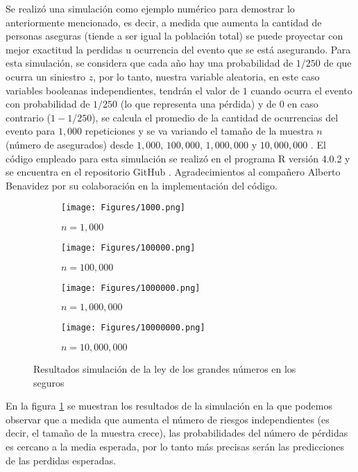 \documentclass{article}
\begin{document}
Se realizó una simulación como ejemplo numérico para demostrar lo anteriormente mencionado, es decir, a medida que aumenta la cantidad de personas aseguras (tiende a ser igual la población total) se puede proyectar con mejor exactitud la perdidas u ocurrencia del evento que se está asegurando. Para esta simulación, se considera que cada año hay una probabilidad de $1/250$ de que ocurra un siniestro $z$, por lo tanto, nuestra variable aleatoria, en este caso variables booleanas independientes, tendrán el valor de $1$ cuando ocurra el evento con probabilidad de $1/250$ (lo que representa una pérdida) y de $0$ en caso contrario ($1-1/250$), se calcula el promedio de la cantidad de ocurrencias del evento para $1,000$ repeticiones y se va variando el tamaño de la muestra $n$ (número de asegurados) desde $1,000$, $100,000$, $1,000,000$ y $10,000,000$ \cite{notasdeclaseinsurance}. El código empleado para esta simulación se realizó en el programa R versión 4.0.2 \cite{r} y se encuentra en el repositorio GitHub \cite{github}. Agradecimientos al compañero Alberto Benavidez por su colaboración en la implementación del código.

\begin{figure}[h]
    \begin{center}
    \captionsetup{justification=centering}
    \begin{subfigure}[b]{0.5\textwidth}
        \texttt{[image: Figures/1000.png]}
        \caption{$n=1,000$}
    \end{subfigure}
    \begin{subfigure}[b]{0.4\textwidth}
        \texttt{[image: Figures/100000.png]}
        \caption{$n=100,000$}
    \end{subfigure}
        \begin{subfigure}[b]{0.5\textwidth}
        \texttt{[image: Figures/1000000.png]}
        \caption{$n=1,000,000$}
    \end{subfigure}
    \begin{subfigure}[b]{0.4\textwidth}
        \texttt{[image: Figures/10000000.png]}
        \caption{$n=10,000,000$}
    \end{subfigure}
    \caption{Resultados simulación de la ley de los grandes números en los seguros}
    \label{resultados}
    \end{center}
\end{figure}

En la figura \ref{resultados} se muestran los resultados de la simulación en la que podemos observar que a medida que aumenta el número de riesgos independientes (es decir, el tamaño de la muestra crece), las probabilidades del número de pérdidas es cercano a la media esperada, por lo tanto más precisas serán las predicciones de las perdidas esperadas.




\end{document}
